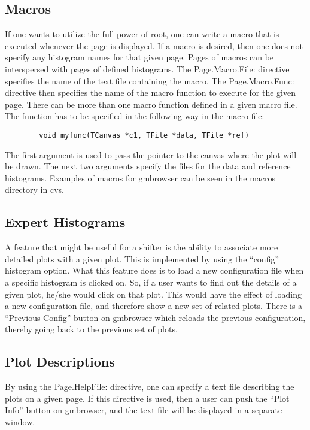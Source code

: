 \documentclass[12pt]{article}
\begin{document}
\subsection[Macros]{Macros}
If one wants to utilize the full power of root, one can write
a macro that is executed whenever the page is displayed.
If a macro is desired, then one does not specify any
histogram names for that given page. Pages of macros can
be interspersed with pages of defined histograms. The
Page.Macro.File: directive specifies the name of the
text file containing the macro. The Page.Macro.Func: directive
then specifies the name of the macro function to execute for
the given page. There can be more than one macro function 
defined in a given macro file. The function has to be
specified in the following way in the macro file:
\begin{verbatim}
        void myfunc(TCanvas *c1, TFile *data, TFile *ref)
\end{verbatim}
The first argument is used to pass the pointer to the
canvas where the plot will be drawn. The next two 
arguments specify the files for the data and reference
histograms. Examples of macros for gmbrowser can be seen
in the macros directory in cvs.

\subsection[Expert Histograms]{Expert Histograms}
A feature that might be useful for a shifter is the ability 
to associate more detailed plots with a given plot. This 
is implemented by using the ``config'' histogram option.
What this feature does is to load a new configuration file
when a specific histogram is clicked on. So, if a user
wants to find out the details of a given plot, he/she would
click on that plot. This would have the effect of loading
a new configuration file, and therefore show a new set of
related plots. There is a ``Previous Config'' button on
gmbrowser which reloads the previous configuration, thereby
going back to the previous set of plots.

\subsection[Plot Descriptions]{Plot Descriptions}
By using the Page.HelpFile: directive, one can specify a text file
describing the plots on a given page. If this directive is
used, then a user can push the ``Plot Info'' button 
on gmbrowser, and the text file will be displayed in a separate
window.
\end{document}
